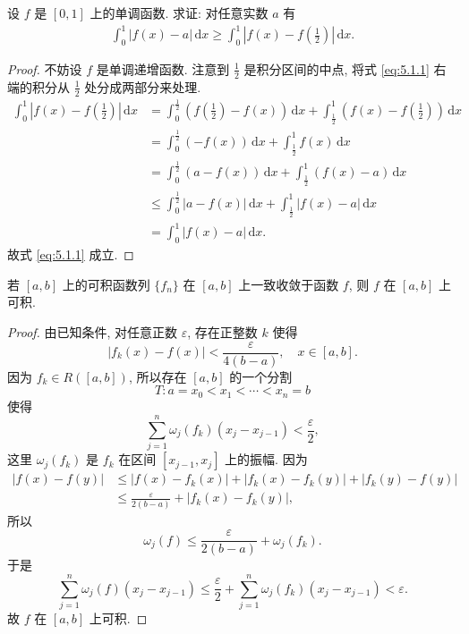 \documentclass[../../main.tex]{subfiles}
\begin{document}
\begin{proposition}\label{proposition:单调函数减任意常数积分小于减其中点的积分}
设 $f$ 是 $[0,1]$ 上的单调函数. 求证: 对任意实数 $a$ 有
\begin{align}\label{eq:5.1.1}
\int_{0}^{1}|f(x)-a|\,\mathrm{d}x\geqslant\int_{0}^{1}\left|f(x)-f\left(\frac{1}{2}\right)\right|\,\mathrm{d}x.
\end{align}
\end{proposition}
\begin{proof}
不妨设 $f$ 是单调递增函数. 注意到 $\frac{1}{2}$ 是积分区间的中点, 将式 \eqref{eq:5.1.1} 右端的积分从 $\frac{1}{2}$ 处分成两部分来处理.
\begin{align*}
\int_{0}^{1}\left|f(x)-f\left(\frac{1}{2}\right)\right|\,\mathrm{d}x&=\int_{0}^{\frac{1}{2}}\left(f\left(\frac{1}{2}\right)-f(x)\right)\,\mathrm{d}x+\int_{\frac{1}{2}}^{1}\left(f(x)-f\left(\frac{1}{2}\right)\right)\,\mathrm{d}x\\
&=\int_{0}^{\frac{1}{2}}(-f(x))\,\mathrm{d}x+\int_{\frac{1}{2}}^{1}f(x)\,\mathrm{d}x\\
&=\int_{0}^{\frac{1}{2}}(a-f(x))\,\mathrm{d}x+\int_{\frac{1}{2}}^{1}(f(x)-a)\,\mathrm{d}x\\
&\leqslant\int_{0}^{\frac{1}{2}}|a-f(x)|\,\mathrm{d}x+\int_{\frac{1}{2}}^{1}|f(x)-a|\,\mathrm{d}x\\
&=\int_{0}^{1}|f(x)-a|\,\mathrm{d}x.
\end{align*}
故式 \eqref{eq:5.1.1} 成立.

\end{proof}

\begin{example}
若 $[a,b]$ 上的可积函数列 $\{f_n\}$ 在 $[a,b]$ 上一致收敛于函数 $f$, 则 $f$ 在 $[a,b]$ 上可积.
\end{example}
\begin{proof}
由已知条件, 对任意正数 $\varepsilon$, 存在正整数 $k$ 使得
$$|f_k(x)-f(x)|<\frac{\varepsilon}{4(b-a)}, \quad x \in[a,b].$$
因为 $f_k \in R([a,b])$, 所以存在 $[a,b]$ 的一个分割
$$T: a=x_0<x_1<\cdots<x_n=b$$
使得
$$\sum_{j=1}^n \omega_j(f_k)(x_j-x_{j-1})<\frac{\varepsilon}{2},$$
这里 $\omega_j(f_k)$ 是 $f_k$ 在区间 $[x_{j-1},x_j]$ 上的振幅. 因为
$$
\begin{aligned}
|f(x)-f(y)| & \leqslant |f(x)-f_k(x)|+\left|f_k(x)-f_k(y)\right|+\left|f_k(y)-f(y)\right| \\
& \leqslant  \frac{\varepsilon}{2(b-a)}+\left|f_k(x)-f_k(y)\right|,
\end{aligned}
$$
所以
$$\omega_j(f) \leqslant  \frac{\varepsilon}{2(b-a)}+\omega_j(f_k).$$
于是
$$\sum_{j=1}^n \omega_j(f)\left(x_j-x_{j-1}\right) \leqslant  \frac{\varepsilon}{2}+\sum_{j=1}^n \omega_j\left(f_k\right)\left(x_j-x_{j-1}\right)<\varepsilon.$$
故 $f$ 在 $[a,b]$ 上可积.

\end{proof}
\end{document}
